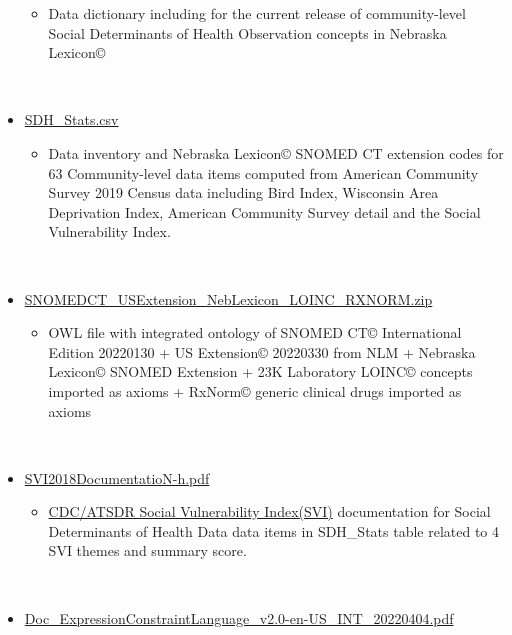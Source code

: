 \documentclass[
]{journal}
\providecommand{\tightlist}{%
  \setlength{\itemsep}{0pt}\setlength{\parskip}{0pt}}
\begin{document}
\begin{itemize}
  \begin{itemize}
  \tightlist
  \item
    Data dictionary including for the current release of community-level Social Determinants of Health Observation concepts in Nebraska Lexicon©\\
    \strut \\
  \end{itemize}
\item
  \href{https://github.com/UNMC-CRANE/AMIA_Workshop_May_2022/blob/main/Handouts_for_workshop/SDH_Stats.csv}{SDH\_Stats.csv}

  \begin{itemize}
  \tightlist
  \item
    Data inventory and Nebraska Lexicon© SNOMED CT extension codes for 63 Community-level data items computed from American Community Survey 2019 Census data including Bird Index, Wisconsin Area Deprivation Index, American Community Survey detail and the Social Vulnerability Index.\\
    \strut \\
  \end{itemize}
\item
  \href{https://github.com/UNMC-CRANE/AMIA_Workshop_May_2022/blob/main/Handouts_for_workshop/SNOMEDCT_USExtension_NebLexicon_LOINC_RxNorm_20220426.zip}{SNOMEDCT\_USExtension\_NebLexicon\_LOINC\_RXNORM.zip}

  \begin{itemize}
  \tightlist
  \item
    OWL file with integrated ontology of SNOMED CT© International Edition 20220130 + US Extension© 20220330 from NLM + Nebraska Lexicon© SNOMED Extension + 23K Laboratory LOINC© concepts imported as axioms + RxNorm© generic clinical drugs imported as axioms\\
    \strut \\
  \end{itemize}
\item
  \href{https://github.com/UNMC-CRANE/AMIA_Workshop_May_2022/blob/main/Handouts_for_workshop/SVI2018Documentation-H.pdf}{SVI2018DocumentatioN-h.pdf}

  \begin{itemize}
  \tightlist
  \item
    \href{https:/atsdr.cdc.gov/placeandhealth/svi/index.html}{CDC/ATSDR Social Vulnerability Index(SVI)} documentation for Social Determinants of Health Data data items in SDH\_Stats table related to 4 SVI themes and summary score.\\
    \strut \\
  \end{itemize}
\item
  \href{https://github.com/UNMC-CRANE/AMIA_Workshop_May_2022/blob/main/Handouts_for_workshop/doc_ExpressionConstraintLanguage_v2.0-en-US_INT_20220404.pdf}{Doc\_ExpressionConstraintLanguage\_v2.0-en-US\_INT\_20220404.pdf}


\end{itemize}
\end{document}
